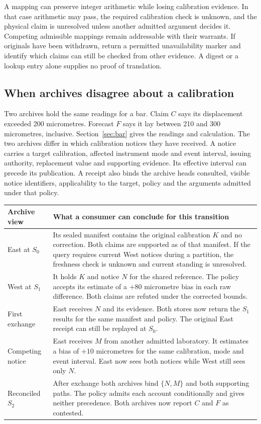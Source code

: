 \documentclass[11pt,a4paper]{article}
\begin{document}
A mapping can preserve integer arithmetic while losing calibration evidence. In that case arithmetic may pass, the required calibration check is unknown, and the physical claim is unresolved unless another admitted argument decides it. Competing admissible mappings remain addressable with their warrants. If originals have been withdrawn, return a permitted unavailability marker and identify which claims can still be checked from other evidence. A digest or a lookup entry alone supplies no proof of translation.

\clearpage
{}
\subsection*{When archives disagree about a calibration}\label{sec:rivals}
Two archives hold the same readings for a bar. Claim $C$ says its displacement exceeded 200 micrometres. Forecast $F$ says it lay between 210 and 300 micrometres, inclusive. Section~\ref{sec:bar} gives the readings and calculation. The two archives differ in which calibration notices they have received. A notice carries a target calibration, affected instrument mode and event interval, issuing authority, replacement value and supporting evidence. Its effective interval can precede its publication. A receipt also binds the archive heads consulted, visible notice identifiers, applicability to the target, policy and the arguments admitted under that policy.

\small
\begin{tabularx}{\linewidth}{@{}L{.22\linewidth}Y@{}}
\toprule
\textbf{Archive view} & \textbf{What a consumer can conclude for this transition} \\ \midrule
East at $S_0$ & Its sealed manifest contains the original calibration $K$ and no correction. Both claims are supported as of that manifest. If the query requires current West notices during a partition, the freshness check is unknown and current standing is unresolved. \\
West at $S_1$ & It holds $K$ and notice $N$ for the shared reference. The policy accepts its estimate of a $+80$ micrometre bias in each raw difference. Both claims are refuted under the corrected bounds. \\
First exchange & East receives $N$ and its evidence. Both stores now return the $S_1$ results for the same manifest and policy. The original East receipt can still be replayed at $S_0$. \\
Competing notice & East receives $M$ from another admitted laboratory. It estimates a bias of $+10$ micrometres for the same calibration, mode and event interval. East now sees both notices while West still sees only $N$. \\
Reconciled $S_2$ & After exchange both archives bind $\{N,M\}$ and both supporting paths. The policy admits each account conditionally and gives neither precedence. Both archives now report $C$ and $F$ as contested. \\
\bottomrule
\end{tabularx}
\normalsize
\end{document}
